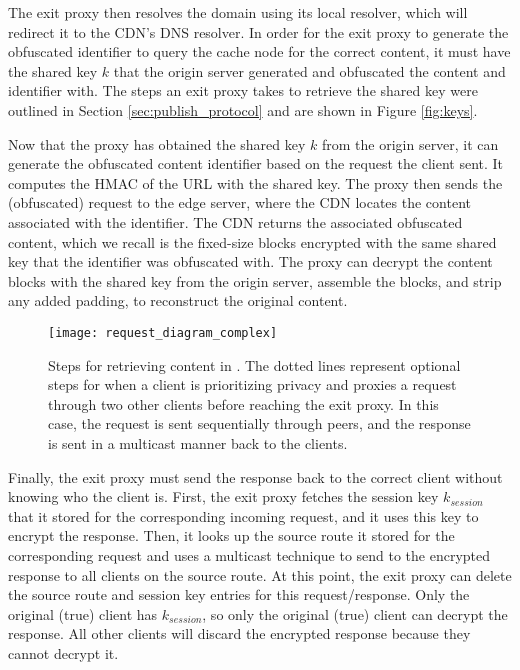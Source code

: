 The exit proxy then resolves the domain using its local resolver, which will redirect it to the CDN's DNS resolver. In order for the exit proxy to 
generate the obfuscated identifier to query the cache node for the correct content, 
it must have the shared key $k$ that the origin server generated and obfuscated the content and identifier 
with.  The steps an exit proxy takes to retrieve the shared key were outlined in Section \ref{sec:publish_protocol} and are shown in Figure \ref{fig:keys}.

Now that the proxy has obtained the shared key $k$ from the origin server, it can generate the obfuscated content identifier based 
on the request the client sent.  It computes the HMAC of the URL with the shared key.  The proxy then 
sends the (obfuscated) request to the edge server, where the CDN locates the content associated with the identifier.  The CDN returns 
the associated obfuscated content, which we recall is the fixed-size blocks encrypted with the same shared key that the identifier was 
obfuscated with.  The proxy can decrypt the content blocks with the shared key from the origin server, assemble the blocks, and strip any 
added padding, to reconstruct the original content.


\begin{figure}[t!]
\centering
\texttt{[image: request\_diagram\_complex]}
\caption{Steps for retrieving content in \system{}.  The dotted lines represent 
optional steps for when a client is prioritizing 
privacy and proxies a request through two other clients before reaching the 
exit proxy.  In this case, the request is sent sequentially through peers, 
and the response is sent in a multicast manner back to the clients.}
\label{fig:retrieving2}
\end{figure}

Finally, the exit proxy must send the response back to the correct client without
knowing who the client is.  First, the exit proxy fetches the session key $k_{session}$
that it stored for the corresponding incoming request, and it uses this key to encrypt the response.  Then, it looks up the source route it stored for the corresponding request 
and uses a multicast technique to send to the encrypted response to all clients on the source route.  At this point, the exit proxy can delete the source route and session key entries 
for this request/response.  Only the original (true) client has $k_{session}$, so only the original (true) client can decrypt the response.  All other clients will discard 
the encrypted response because they cannot decrypt it.  

